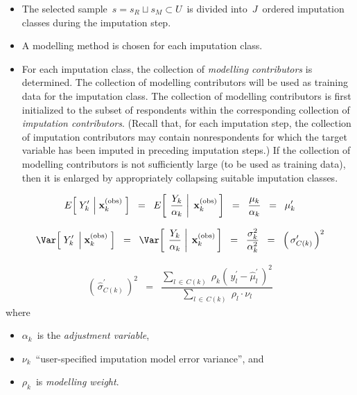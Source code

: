 \begin{itemize}
\item
    The selected sample
    \,$s = s_{R} \sqcup s_{M} \subset U$\,
    is divided into \,$J$\, ordered imputation classes
    during the imputation step.
\item
    A modelling method is chosen for each imputation class.
\item
    For each imputation class, the collection of \textit{modelling contributors} is determined.
    The collection of modelling contributors will be used as training data for the imputation class.
    \vskip 0.01cm
    \noindent
    The collection of modelling contributors is first initialized to the subset of respondents
    within the corresponding collection of \textit{imputation contributors}.
    (Recall that, for each imputation step, the collection of imputation contributors
    may contain nonrespondents for which the target variable has been imputed in preceding imputation steps.)
    If the collection of modelling contributors is not sufficiently large
    (to be used as training data), then it is enlarged by appropriately collapsing suitable imputation classes.
\end{itemize}


\begin{equation*}
E\!\left[\;
    Y^{\prime}_{k}
    \,\left\vert\;
    \mathbf{x}^{\textnormal{(obs)}}_{k}
    \right.
    \,\right]
\;\; = \;\;
    E\!\left[\;
        \left.
        \dfrac{Y_{k}}{\alpha_{k}}
        \;\right\vert\;
        \mathbf{x}^{\textnormal{(obs)}}_{k}
        \,\right]
\;\; = \;\;
    \dfrac{\mu_{k}}{\alpha_{k}}
\;\; = \;\;
    \mu^{\prime}_{k}
\end{equation*}

\begin{equation*}
\Var\!\left[\;
    Y^{\prime}_{k}
    \;\left\vert\;
    \mathbf{x}^{\textnormal{(obs)}}_{k}
    \right.
    \,\right]
\;\; = \;\;
    \Var\!\left[\;
        \left.
        \dfrac{Y_{k}}{\alpha_{k}}
        \;\right\vert\;
        \mathbf{x}^{\textnormal{(obs)}}_{k}
        \,\right]
\;\; = \;\;
    \dfrac{\sigma_{k}^{2}}{\alpha_{k}^{2}}
\;\; = \;\;
    \left(\,\sigma^{\prime}_{C(k)}\,\right)^{2}
\end{equation*}

\begin{eqnarray*}
\left(\,\widehat{\sigma}^{\prime}_{C(k)}\,\right)^{2}
& = &
    \dfrac{
        \underset{l\,\in\,C(k)}{\sum}\;
        \rho_{k}
        \left(\,y^{\prime}_{l} - \widehat{\mu}^{\prime}_{l}\,\right)^{2}
        }{
        \underset{l\,\in\,C(k)}{\sum}\;
        \rho_{l}\cdot\nu_{l}
        }
\end{eqnarray*}
where
\begin{itemize}
\item
    $\alpha_{k}$\, is the \textit{adjustment variable},
\item
    $\nu_{k}$\, ``user-specified imputation model error variance'', and
\item
    $\rho_{k}$\, is \textit{modelling weight}.
\end{itemize}

